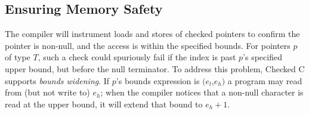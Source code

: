 \subsection{Ensuring Memory Safety}


%
%
%
%
%
%

The \checkedc compiler will instrument loads and stores of checked
pointers to confirm the pointer is non-null, and the access is within
the specified bounds. For pointers $p$ of type
$T$\code{>}, such a check could spuriously fail if
the index is past $p$'s specified upper bound, but before the null
terminator. To address this problem, Checked C supports \emph{bounds
  widening}.
If $p$'s bounds expression is $(e_l$,$e_h)$ a program may read from (but not
write to) $e_h$; when the compiler notices that a non-null character
is read at the upper bound, it will extend that bound to $e_h+1$.

